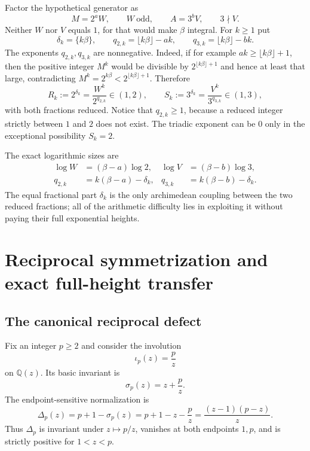 \documentclass[11pt]{article}
\theoremstyle{definition}
\theoremstyle{remark}
\newcommand{\Q}{\mathbb{Q}}
\begin{document}
Factor the hypothetical generator as
\begin{equation}\label{eq:primitive-parts}
 M=2^aW,\qquad W\ \text{odd},
 \qquad
 A=3^bV,\qquad 3\nmid V.
\end{equation}
Neither $W$ nor $V$ equals $1$, for that would make $\beta$ integral.  For $k\ge1$ put
\begin{equation}\label{eq:delta-q}
 \delta_k=\{k\beta\},\qquad
 q_{2,k}=\lfloor k\beta\rfloor-ak,
 \qquad
 q_{3,k}=\lfloor k\beta\rfloor-bk.
\end{equation}
The exponents $q_{2,k},q_{3,k}$ are nonnegative.  Indeed, if for example $ak\ge\lfloor k\beta\rfloor+1$, then the positive integer $M^k$ would be divisible by $2^{\lfloor k\beta\rfloor+1}$ and hence at least that large, contradicting $M^k=2^{k\beta}<2^{\lfloor k\beta\rfloor+1}$.  Therefore
\begin{equation}\label{eq:normalized-orbit}
 R_k:=2^{\delta_k}=\frac{W^k}{2^{q_{2,k}}}\in(1,2),
 \qquad
 S_k:=3^{\delta_k}=\frac{V^k}{3^{q_{3,k}}}\in(1,3),
\end{equation}
with both fractions reduced.  Notice that $q_{2,k}\ge1$, because a reduced integer strictly between $1$ and $2$ does not exist.  The triadic exponent can be $0$ only in the exceptional possibility $S_k=2$.

The exact logarithmic sizes are
\begin{align}
 \log W&=(\beta-a)\log2, &
 \log V&=(\beta-b)\log3,\label{eq:logWV}\\
 q_{2,k}&=k(\beta-a)-\delta_k, &
 q_{3,k}&=k(\beta-b)-\delta_k.\label{eq:qexact}
\end{align}
The equal fractional part $\delta_k$ is the only archimedean coupling between the two reduced fractions; all of the arithmetic difficulty lies in exploiting it without paying their full exponential heights.

\section{Reciprocal symmetrization and exact full-height transfer}
\label{sec:reciprocal}

\subsection{The canonical reciprocal defect}

Fix an integer $p\ge2$ and consider the involution
\begin{equation}\label{eq:involution}
 \iota_p(z)=\frac pz
\end{equation}
 on $\Q(z)$.  Its basic invariant is
\begin{equation}\label{eq:trace-invariant}
 \sigma_p(z)=z+\frac pz.
\end{equation}
The endpoint-sensitive normalization is
\begin{equation}\label{eq:Delta-def}
 \Delta_p(z)=p+1-\sigma_p(z)
 =p+1-z-\frac pz
 =\frac{(z-1)(p-z)}z.
\end{equation}
Thus $\Delta_p$ is invariant under $z\mapsto p/z$, vanishes at both endpoints $1,p$, and is strictly positive for $1<z<p$.
\end{document}
